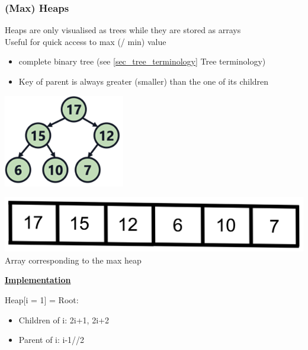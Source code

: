 \subsubsection{(Max) Heaps}
    Heaps are only visualised as trees while they are stored as arrays\\
    Useful for quick access to max (/ min) value
    \begin{itemize}
        \item complete binary tree (see \ref{sec_tree_terminology} Tree terminology)
        \item Key of parent is always greater (smaller) than the one of its children
    \end{itemize}
    \begin{minipage}{0.49\linewidth}
        \includegraphics[width = 0.95\linewidth]{src/5_data_structure/images/max_heap.png}
    \end{minipage}
    \begin{minipage}{0.49\linewidth}
        \includegraphics[width = 0.95\linewidth]{src/5_data_structure/images/max_heap_array.png}
        Array corresponding to the max heap
    \end{minipage}

    {\centering\underline{\textbf{Implementation}} \par}
        Heap[i = 1] = Root:\\
        \begin{itemize}
            \item Children of i: {2i+1, 2i+2}
            \item Parent of i: i-1//2
        \end{itemize}


